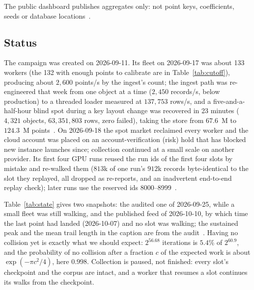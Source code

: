 The public dashboard publishes aggregates only: not point keys,
coefficients, seeds or database locations~.

\subsection{Status}
\label{sec:campaign-state}

The campaign was created on 2026-09-11. Its fleet on 2026-09-17 was about 133 workers (the 132 with enough
points to calibrate are in Table~\ref{tab:cutoff}), producing about
$2{,}600$ points/s by the ingest's count; the ingest path was re-engineered that week from one object
at a time ($2{,}450$ records/s, below production) to a threaded loader
measured at $137{,}753$ rows/s, and a five-and-a-half-hour blind spot during a key layout change was
recovered in 23 minutes ($4{,}321$ objects,
$63{,}351{,}803$ rows, zero failed), taking the store from $67.6$~M to
$124.3$~M points~. On 2026-09-18 the spot market reclaimed every worker and the cloud
account was placed on an account-verification (risk) hold that has
blocked new instance launches since; collection continued at a small
scale on another provider. Its first four GPU runs reused the run ids
of the first four slots by mistake and re-walked them ($813$k of one
run's $912$k records byte-identical to the slot they replayed, all
dropped as re-reports, and an inadvertent end-to-end replay check);
later runs use the reserved ids
8000--8999~.

Table~\ref{tab:state} gives two snapshots: the audited one of
2026-09-25, while a small fleet was still walking, and the published
feed of 2026-10-10, by which time the last point had landed
(2026-10-07) and no slot was walking; the sustained peak and the
mean trail length in the caption are from the
audit~.
Having no collision yet is exactly what we should expect: $2^{56.68}$ iterations is $5.4\%$
of $2^{60.9}$, and the probability of no collision after a fraction
$c$ of the expected work is about $\exp(-\pi c^2/4)$, here $0.998$.
Collection is paused, not finished: every slot's checkpoint and the
corpus are intact, and a worker that resumes a slot continues its
walks from the checkpoint.

